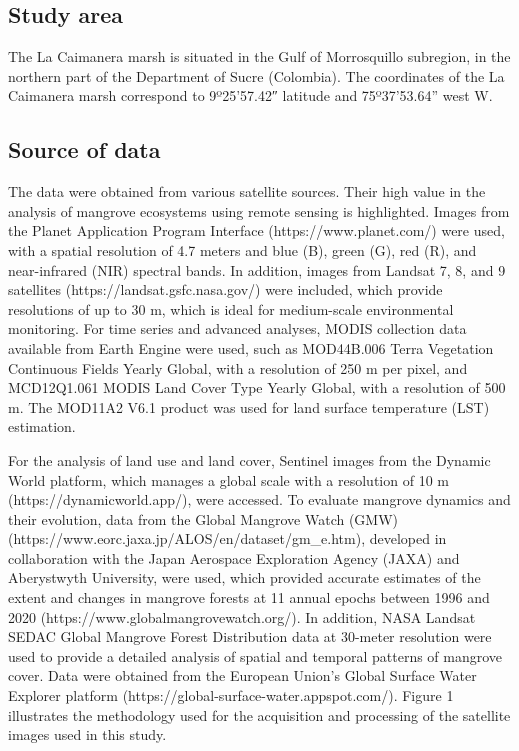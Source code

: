 \documentclass[10pt,a4paper,twocolumn]{article}
\begin{document}
\subsection*{Study area}
The La Caimanera marsh is situated in the Gulf of Morrosquillo subregion, in the northern part of the Department of Sucre (Colombia). The coordinates of the La Caimanera marsh correspond to 9º25'57.42″ latitude and 75º37'53.64” west W.

\subsection*{Source of data}

The data were obtained from various satellite sources. Their high value in the analysis of mangrove ecosystems using remote sensing is highlighted. Images from the Planet Application Program Interface (https://www.planet.com/) were used, with a spatial resolution of 4.7 meters and blue (B), green (G), red (R), and near-infrared (NIR) spectral bands. In addition, images from Landsat 7, 8, and 9 satellites (https://landsat.gsfc.nasa.gov/) were included, which provide resolutions of up to 30 m, which is ideal for medium-scale environmental monitoring. For time series and advanced analyses, MODIS collection data available from Earth Engine were used, such as MOD44B.006 Terra Vegetation Continuous Fields Yearly Global, with a resolution of 250 m per pixel, and MCD12Q1.061 MODIS Land Cover Type Yearly Global, with a resolution of 500 m. The MOD11A2 V6.1 product was used for land surface temperature (LST) estimation.

For the analysis of land use and land cover, Sentinel images from the Dynamic World platform, which manages a global scale with a resolution of 10 m (https://dynamicworld.app/), were accessed. To evaluate mangrove dynamics and their evolution, data from the Global Mangrove Watch (GMW) (https://www.eorc.jaxa.jp/ALOS/en/dataset/gm\_e.htm), developed in collaboration with the Japan Aerospace Exploration Agency (JAXA) and Aberystwyth University, were used, which provided accurate estimates of the extent and changes in mangrove forests at 11 annual epochs between 1996 and 2020 (https://www.globalmangrovewatch.org/). In addition, NASA Landsat SEDAC Global Mangrove Forest Distribution data at 30-meter resolution were used to provide a detailed analysis of spatial and temporal patterns of mangrove cover.  Data were obtained from the European Union's Global Surface Water Explorer platform (https://global-surface-water.appspot.com/). Figure 1 illustrates the methodology used for the acquisition and processing of the satellite images used in this study.    
\end{document}
